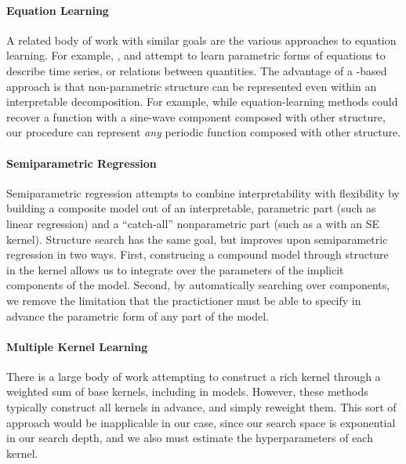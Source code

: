 \documentclass[twoside]{article}
\begin{document}
\paragraph{Equation Learning}
A related body of work with similar goals are the various approaches to equation learning.  
For example, \cite{schmidt2009distilling}, \cite{todorovski1997declarative} and \cite{washio1999discovering} attempt to learn parametric forms of equations to describe time series, or relations between quantities.  The advantage of a \gp{}-based approach is that non-parametric structure can be represented even within an interpretable decomposition.  For example, while equation-learning methods could recover a function with a sine-wave component composed with other structure, our procedure can represent \emph{any} periodic function composed with other structure.

\paragraph{Semiparametric Regression}
Semiparametric regression  attempts to combine interpretability with flexibility by building  a composite model out of an interpretable, parametric part (such as linear regression) and a ``catch-all'' nonparametric part (such as a \gp{} with an SE kernel).
Structure search has the same goal, but improves upon semiparametric regression in two ways.
First, construcing a compound model through structure in the kernel allows us to integrate over the parameters of the implicit components of the model.
Second, by automatically searching over components, we remove the limitation that the practictioner must be able to specify in advance the parametric form of any part of the model.


\paragraph{Multiple Kernel Learning}
There is a large body of work attempting to construct a rich kernel through a weighted sum of base kernels, including in \gp{} models.  
\cite{christoudias2009bayesian}
However, these methods typically construct all kernels in advance, and simply reweight them.  This sort of approach would be inapplicable in our case, since our search space is exponential in our search depth, and we also must estimate the hyperparameters of each kernel.%
\end{document}
